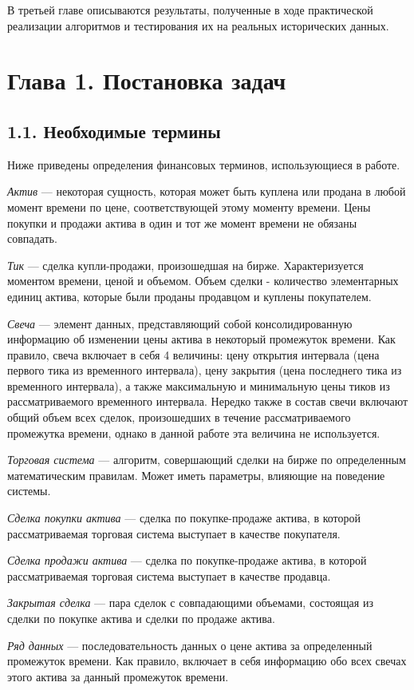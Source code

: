 \documentclass[12pt]{article}
\begin{document}
В третьей главе описываются результаты, полученные в ходе практической реализации алгоритмов и тестирования их на реальных исторических данных.
\section{Глава 1. Постановка задач}
\subsection{1.1. Необходимые термины}
Ниже приведены определения финансовых терминов, использующиеся в работе.

{\it Актив} --- некоторая сущность, которая может быть куплена или продана в любой момент времени по цене, соответствующей этому моменту времени. Цены покупки и продажи актива в один и тот же момент времени не обязаны совпадать.

{\it Тик} --- сделка купли-продажи, произошедшая на бирже. Характеризуется моментом времени, ценой и объемом. Объем сделки - количество элементарных единиц актива, которые были проданы продавцом и куплены покупателем.

{\it Свеча} --- элемент данных, представляющий собой консолидированную информацию об изменении цены актива в некоторый промежуток времени. Как правило, свеча включает в себя 4 величины: цену открытия интервала (цена первого тика из временного интервала), цену закрытия (цена последнего тика из временного интервала), а также максимальную и минимальную цены тиков из рассматриваемого временного интервала. Нередко также в состав свечи включают общий объем всех сделок, произошедших в течение рассматриваемого промежутка времени, однако в данной работе эта величина не используется.

{\it Торговая система} --- алгоритм, совершающий сделки на бирже по определенным математическим правилам. Может иметь параметры, влияющие на поведение системы.

{\it Сделка покупки актива} --- сделка по покупке-продаже актива, в которой рассматриваемая торговая система выступает в качестве покупателя.

{\it Сделка продажи актива} --- сделка по покупке-продаже актива, в которой рассматриваемая торговая система выступает в качестве продавца.

{\it Закрытая сделка} --- пара сделок с совпадающими объемами, состоящая из сделки по покупке актива и сделки по продаже актива.

{\it Ряд данных} --- последовательность данных о цене актива за определенный промежуток времени. Как правило, включает в себя информацию обо всех свечах этого актива за данный промежуток времени.
\end{document}
